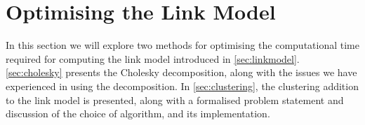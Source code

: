 \section{Optimising the Link Model}\label{sec:optimization}
In this section we will explore two methods for optimising the computational time required for computing the link model introduced in \autoref{sec:linkmodel}. \autoref{sec:cholesky} presents the Cholesky decomposition, along with the issues we have experienced in using the decomposition. In \autoref{sec:clustering}, the clustering addition to the link model is presented, along with a formalised problem statement and discussion of the choice of algorithm, and its implementation.


